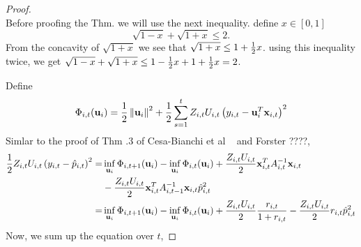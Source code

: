 \begin{proof} 
\\ 
Before proofing the Thm. we will use the next inequality. define $x\in[0,1]$
\begin{equation}
\sqrt{1-x}+\sqrt{1+x}\le2.
\label{technical_inequality}
\end{equation}
From the concavity of $\sqrt{1+x}$ we see that $\sqrt{1+x}\le1+\frac{1}{2} x$. using this inequality twice, we get $\sqrt{1-x}+\sqrt{1+x}\le1-\frac{1}{2} x+1+\frac{1}{2} x=2$.

Define 
\begin{equation*}
\Phi_{i,t}(\mathbf{u}_i)=\frac{1}{2}\left\Vert {\mathbf{u}_i} \right\Vert^2+\frac{1}{2}\sum_{s=1}^{t}{Z_{i,t}U_{i,t}\left({y_{i,t}-\mathbf{u}_i^T\mathbf{x}_{i,t}}\right)}^2
\end{equation*}
Simlar to the proof of Thm .3 of Cesa-Bianchi et al ~\cite{cesa2006worst} and Forster ????,
\begin{equation*}
\begin{split}
\frac{1}{2} Z_{i,t}U_{i,t}\left({y_{i,t}-\hat{p}_{i,t}}\right)^{2}= &\inf_{\mathbf{u}_i}{\Phi_{i,t+1}}(\mathbf{u}_i)-\inf_{\mathbf{u}_i}{\Phi_{i,t}}(\mathbf{u}_i)+\frac{Z_{i,t}U_{i,t}}{2}\mathbf{x}_{i,t}^TA_{i,t}^{-1}\mathbf{x}_{i,t}\\
&-\frac{Z_{i,t}U_{i,t}}{2}\mathbf{x}_{i,t}^TA_{i,t-1}^{-1}\mathbf{x}_{i,t}\hat{p}_{i,t}^2\\
=&\inf_{\mathbf{u}_i}{\Phi_{i,t+1}}(\mathbf{u}_i)-\inf_{\mathbf{u}_i}{\Phi_{i,t}}(\mathbf{u}_i)+\frac{Z_{i,t}U_{i,t}}{2}\frac{r_{i,t}}{1+r_{i,t}}-\frac{Z_{i,t}U_{i,t}}{2}r_{i,t}\hat{p}_{i,t}^2
\end{split}
\end{equation*} 
Now, we sum up the equation over $t$,
 

\end{proof}
